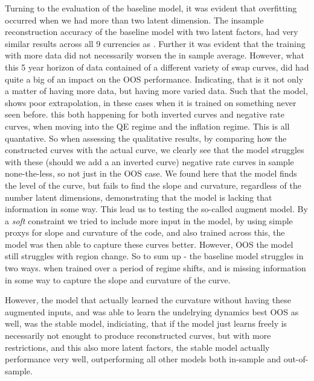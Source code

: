 
Turning to the evaluation of the baseline model, it was evident that overfitting occurred when we had more than two latent dimension. The insample reconstruction accuracy of the baseline model with two latent factors, had very similar results across all 9 currencies as \cite{MatinWanPoulsen2025}. Further it was evident that the training with more data did not necessarily worsen the in sample average. However, what this 5 year horizon of data contained of a different variety of swap curves, did had quite a big of an impact on the OOS performance. Indicating, that is it not only a matter of having more data, but having more varied data. Such that the model, shows poor extrapolation, in these cases when it is trained on something never seen before. this both happening for both inverted curves and negative rate curves, when moving into the QE regime and the inflation regime. This is all quantative. So when assessing the qualitative results, by comparing how the constructed curves with the actual curve, we clearly see that the model struggles with these (should we add a an inverted curve) negative rate curves in sample none-the-less, so not just in the OOS case. We found here that the model finds the level of the curve, but fails to find the slope and curvature, regardless of the number latent dimensions, demonstrating that the model is lacking that information in some way. This lead us to testing the so-called augment model. By a \textit{soft} constraint we tried to include more input in the model, by using simple proxys for slope and curvature of the code, and also trained across this, the model was then able to capture these curves better. However, OOS the model still struggles with region change. So to sum up - the baseline model struggles in two ways. when trained over a period of regime shifts, and is missing information in some way to capture the slope and curvature of the curve.

However, the model that actually learned the curvature without having these augmented inputs, and was able to learn the undelrying dynamics best OOS as well, was the stable model, indiciating, that if the model just learns freely is necessarily not enought to produce reconstructed curves, but with more restrictions, and this also more latent factors, the stable model actually performance very well, outperforming all other models both in-sample and out-of-sample.

